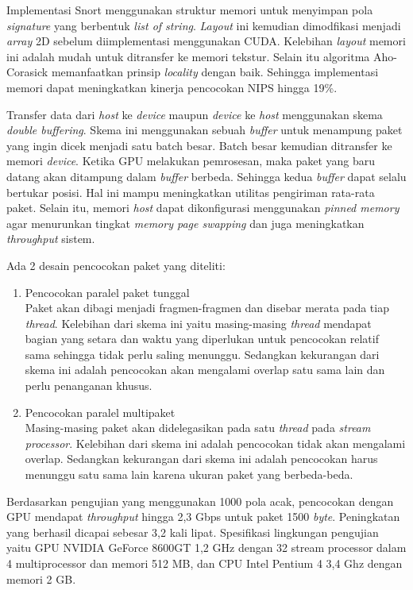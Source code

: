     Implementasi Snort menggunakan struktur memori untuk menyimpan pola \emph{signature} yang berbentuk \emph{list of string}. \emph{Layout} ini kemudian dimodfikasi menjadi \emph{array} 2D sebelum diimplementasi menggunakan CUDA. Kelebihan \emph{layout} memori ini adalah mudah untuk ditransfer ke memori tekstur. Selain itu algoritma Aho-Corasick memanfaatkan prinsip \emph{locality} dengan baik. Sehingga implementasi memori dapat meningkatkan kinerja pencocokan NIPS hingga 19\%.

    Transfer data dari \emph{host} ke \emph{device} maupun \emph{device} ke \emph{host} menggunakan skema \emph{double buffering}. Skema ini menggunakan sebuah \emph{buffer} untuk menampung paket yang ingin dicek menjadi satu batch besar. Batch besar kemudian ditransfer ke memori \emph{device}. Ketika GPU melakukan pemrosesan, maka paket yang baru datang akan ditampung dalam \emph{buffer} berbeda. Sehingga kedua \emph{buffer} dapat selalu bertukar posisi. Hal ini mampu meningkatkan utilitas pengiriman rata-rata paket. Selain itu, memori \emph{host} dapat dikonfigurasi menggunakan \emph{pinned memory} agar menurunkan tingkat \emph{memory page swapping} dan juga meningkatkan \emph{throughput} sistem.

    Ada 2 desain pencocokan paket yang diteliti:
    \begin{enumerate}

      \item Pencocokan paralel paket tunggal \\
      Paket akan dibagi menjadi fragmen-fragmen dan disebar merata pada tiap \emph{thread}. Kelebihan dari skema ini yaitu masing-masing \emph{thread} mendapat bagian yang setara dan waktu yang diperlukan untuk pencocokan relatif sama sehingga tidak perlu saling menunggu. Sedangkan kekurangan dari skema ini adalah pencocokan akan mengalami overlap satu sama lain dan perlu penanganan khusus.

      \item Pencocokan paralel multipaket \\
      Masing-masing paket akan didelegasikan pada satu \emph{thread} pada \emph{stream processor}. Kelebihan dari skema ini adalah pencocokan tidak akan mengalami overlap. Sedangkan kekurangan dari skema ini adalah pencocokan harus menunggu satu sama lain karena ukuran paket yang berbeda-beda.

    \end{enumerate}

    Berdasarkan pengujian yang menggunakan 1000 pola acak, pencocokan dengan GPU mendapat \emph{throughput} hingga 2,3 Gbps untuk paket 1500 \emph{byte}. Peningkatan yang berhasil dicapai sebesar 3,2 kali lipat. Spesifikasi lingkungan pengujian yaitu GPU NVIDIA GeForce 8600GT 1,2 GHz dengan 32 stream processor dalam 4 multiprocessor dan memori 512 MB, dan CPU Intel Pentium 4 3,4 Ghz dengan memori 2 GB.

